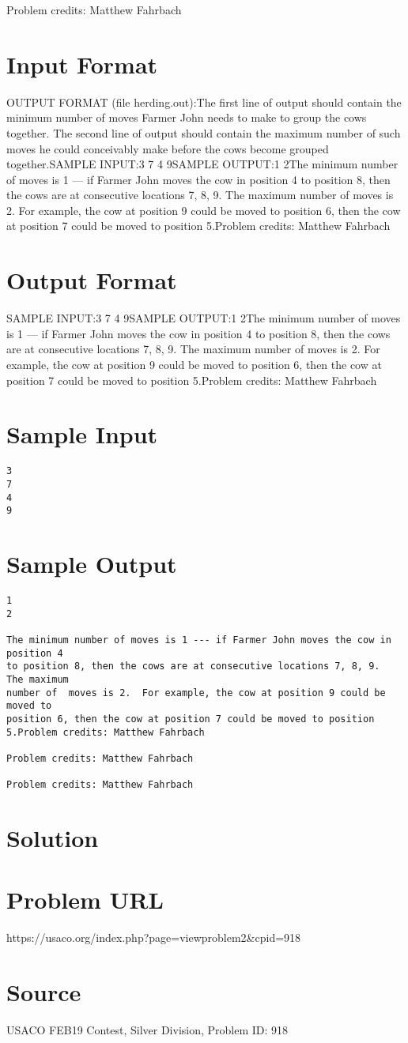 \documentclass[12pt]{article}
\begin{document}
Problem credits: Matthew Fahrbach



\section*{Input Format}
OUTPUT FORMAT (file herding.out):The first line of output should contain the minimum number of moves Farmer John
needs to make to group the cows together.  The second line of output should
contain the maximum number of such moves he could conceivably make before the
cows become grouped together.SAMPLE INPUT:3
7
4
9SAMPLE OUTPUT:1
2The minimum number of moves is 1 --- if Farmer John moves the cow in position 4
to position 8, then the cows are at consecutive locations 7, 8, 9.  The maximum
number of  moves is 2.  For example, the cow at position 9 could be moved to
position 6, then the cow at position 7 could be moved to position 5.Problem credits: Matthew Fahrbach

\section*{Output Format}
SAMPLE INPUT:3
7
4
9SAMPLE OUTPUT:1
2The minimum number of moves is 1 --- if Farmer John moves the cow in position 4
to position 8, then the cows are at consecutive locations 7, 8, 9.  The maximum
number of  moves is 2.  For example, the cow at position 9 could be moved to
position 6, then the cow at position 7 could be moved to position 5.Problem credits: Matthew Fahrbach

\section*{Sample Input}
\begin{verbatim}
3
7
4
9
\end{verbatim}

\section*{Sample Output}
\begin{verbatim}
1
2

The minimum number of moves is 1 --- if Farmer John moves the cow in position 4
to position 8, then the cows are at consecutive locations 7, 8, 9.  The maximum
number of  moves is 2.  For example, the cow at position 9 could be moved to
position 6, then the cow at position 7 could be moved to position 5.Problem credits: Matthew Fahrbach

Problem credits: Matthew Fahrbach

Problem credits: Matthew Fahrbach
\end{verbatim}

\section*{Solution}


\section*{Problem URL}
https://usaco.org/index.php?page=viewproblem2&cpid=918

\section*{Source}
USACO FEB19 Contest, Silver Division, Problem ID: 918
\end{document}
